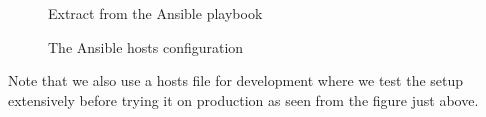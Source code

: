 \begin{figure}[H]
    \centering
    \caption{Extract from the Ansible playbook}
    \label{fig:extract-from-ansible-playbook}
\end{figure}

\begin{figure}[H]
    \centering
    \caption{The Ansible hosts configuration}
    \label{fig:image-of-ansible-hosts}
\end{figure}
Note that we also use a hosts file for development where we test the setup extensively before trying it on production as seen from the figure just above.

